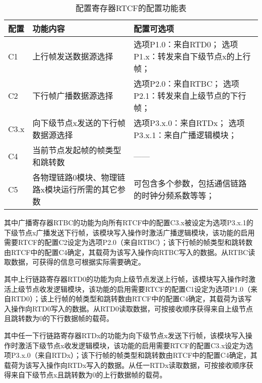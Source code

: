 \begin{table}
    \centering
    \caption[配置寄存器RTCF的配置功能表]{配置寄存器RTCF的配置功能表\label{tb:rtmq_link_rtcf}}
    \begin{tabular}{C{1.5cm}|C{5.5cm}|C{6cm}}
        \toprule
        配置 & 功能内容 & 配置可选项\\
        \midrule
        C1 & 上行帧发送数据源选择 & 选项P1.0：来自RTD0；
        选项P1.x：转发来自下级节点x的上行帧；
        \\
        C2 & 下行帧广播数据源选择 & 选项P2.0：来自RTBC；
        选项P2.1：转发来自上级节点的下行帧；
        \\
        C3.x & 向下级节点x发送的下行帧数据源选择 & 选项P3.x.0：来自RTDx；
        选项P3.x.1：来自广播逻辑模块；
        \\
        C4 & 当前节点发起帧的帧类型和跳转数 & —— \\
        C5 & 各物理链路0模块、物理链路x模块运行所需的其它参数 & 可包含多个参数，包括通信链路的时钟分频系数等等；\\
        \bottomrule
    \end{tabular}
\end{table}

其中广播寄存器RTBC的功能为向所有RTCF中的配置C3.x被设定为选项P3.x.1的下级节点x广播发送下行帧，该模块写入操作时激活广播逻辑模块，该功能的启用需要RTCF的配置C2设定为选项P2.0（来自RTBC）；该下行帧的帧类型和跳转数由RTCF中的配置C4确定，其载荷为该写入操作向RTBC写入的数据。从RTBC读取数据，可获得的信息可根据实际需要确定。

其中上行链路寄存器RTD0的功能为向上级节点发送上行帧，该模块写入操作时激活上级节点收发逻辑模块，该功能的启用需要RTCF的配置C1设定为选项P1.0（来自RTD0）；该上行帧的帧类型和跳转数由RTCF中的配置C4确定，其载荷为该写入操作向RTD0写入的数据。从RTD0读取数据，可按接收顺序获得来自上级节点且跳转数为0的下行数据帧的载荷。

其中任一下行链路寄存器RTDx的功能为向下级节点x发送下行帧，该模块写入操作时激活下级节点x收发逻辑模块，该功能的启用需要RTCF的配置C3.x设定为选项P3.x.0（来自RTDx）；该下行帧的帧类型和跳转数由RTCF中的配置C4确定，其载荷为该写入操作向RTDx写入的数据。从任一RTDx读取数据，可按接收顺序获得来自下级节点x且跳转数为0的上行数据帧的载荷。


